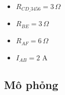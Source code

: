 \begin{dapsobox}
  \begin{itemize}[leftmargin=1.5em]
    \item $R_{CD\_3456} = 3\,\Omega$
    \item $R_{BE} = 3\,\Omega$
    \item $R_{AF} = 6\,\Omega$
    \item $I_{AB} = 2\text{ A}$
  \end{itemize}
\end{dapsobox}

\subsection{Mô phỏng}
\simresult
{}

